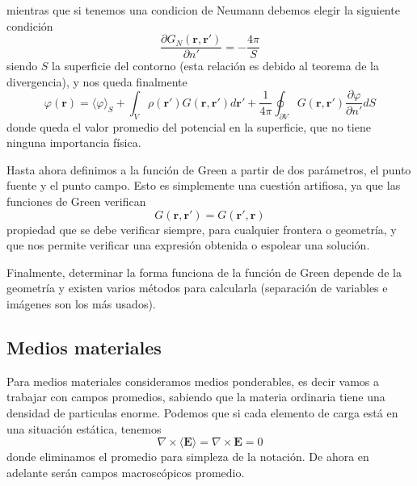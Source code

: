 \documentclass[a4paper]{article}
\numberwithin{equation}{section} %
\renewcommand{\vec}[1]{\boldsymbol{#1}}
\begin{document}
mientras que si tenemos una condicion de Neumann debemos elegir la siguiente condición
\begin{equation}
	\frac{\partial G_{N}(\vec{r},\vec{r}')}{\partial n'} = - \frac{4\pi}{S}
\end{equation}
siendo $S$ la superficie del contorno (esta relación es debido al teorema de la divergencia), y nos queda finalmente
\begin{equation}
		\varphi(\vec{r}) = \langle \varphi \rangle_S + \int_{V} \rho(\vec{r}') G(\vec{r}, \vec{r}') d\vec{r}' + \frac{1}{4\pi} \oint_{\partial V} G(\vec{r}, \vec{r}') \frac{\partial \varphi}{\partial n'} dS 
\end{equation}
donde queda el valor promedio del potencial en la superficie, que no tiene ninguna importancia física.

Hasta ahora definimos a la función de Green a partir de dos parámetros, el punto fuente y el punto campo. Esto es simplemente una cuestión artifiosa, ya que las funciones de Green verifican
\begin{equation}
	G(\vec{r}, \vec{r}') = G(\vec{r}', \vec{r})
\end{equation}
propiedad que se debe verificar siempre, para cualquier frontera o geometría, y que nos permite verificar una expresión obtenida o espolear una solución.

Finalmente, determinar la forma funciona de la función de Green depende de la geometría y existen varios métodos para calcularla (separación de variables e imágenes son los más usados).


\subsection{Medios materiales}

Para medios materiales consideramos medios ponderables, es decir vamos a trabajar con campos promedios, sabiendo que la materia ordinaria tiene una densidad de particulas enorme.
Podemos que si cada elemento de carga está en una situación estática, tenemos
\begin{equation}
\nabla \times \langle \vec{E} \rangle = \nabla \times \vec{E} = 0
\end{equation}
donde eliminamos el promedio para simpleza de la notación. De ahora en adelante serán campos macroscópicos promedio.
\end{document}
